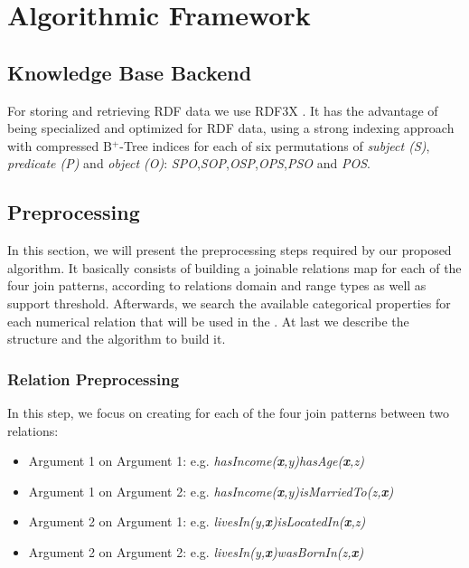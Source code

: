 \chapter{Algorithmic Framework}
\label{ch:intro}

\section{Knowledge Base Backend}

For storing and retrieving RDF data we use RDF3X \cite{Neumann:2010:RES:1731351.1731354}. It has the advantage of being specialized and optimized for RDF data, using a strong indexing approach with compressed B$^+$-Tree indices for each of six permutations of \emph{subject (S)}, \emph{predicate (P)} and \emph{object (O)}: \emph{SPO},\emph{SOP},\emph{OSP},\emph{OPS},\emph{PSO} and \emph{POS}.

\section{Preprocessing}

In this section, we will present the preprocessing steps required by our proposed algorithm. It basically consists of building a joinable relations map for each of the four join patterns, according to relations domain and range types as well as support threshold. Afterwards, we search the available categorical properties for each numerical relation that will be used in the \graphname. At last we describe the \graphname structure and the algorithm to build it.

\subsection{Relation Preprocessing}

In this step, we focus on creating for each of the four join patterns between two relations:

\begin{itemize}
 \item Argument 1 on Argument 1: e.g. \emph{hasIncome(\textbf{x},y)hasAge(\textbf{x},z)}
 \item Argument 1 on Argument 2: e.g. \emph{hasIncome(\textbf{x},y)isMarriedTo(z,\textbf{x})}
 \item Argument 2 on Argument 1: e.g. \emph{livesIn(y,\textbf{x})isLocatedIn(\textbf{x},z)}
 \item Argument 2 on Argument 2: e.g. \emph{livesIn(y,\textbf{x})wasBornIn(z,\textbf{x})}
\end{itemize}



